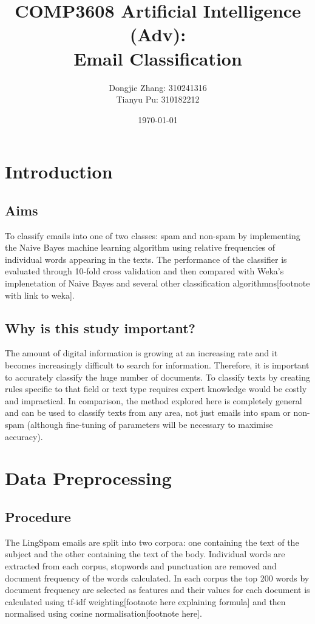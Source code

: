 \documentclass[12pt]{article}
\title{COMP3608 Artificial Intelligence (Adv): \\
Email Classification}
\author{Dongjie Zhang: 310241316 
\\ Tianyu Pu: 310182212}
\date{\today}
\begin{document}
\maketitle

\section{Introduction}
\subsection{Aims}
To classify emails into one of two classes: spam and non-spam by implementing the Naive Bayes machine learning algorithm using relative frequencies of individual words appearing in the texts. The performance of the classifier is evaluated through 10-fold cross validation and then compared with Weka's implenetation of Naive Bayes and several other classification algorithmns[footnote with link to weka].

\subsection{Why is this study important?}
The amount of digital information is growing at an increasing rate and it becomes increasingly difficult to search for information. Therefore, it is important to accurately classify the huge number of documents. To classify texts by creating rules specific to that field or text type requires expert knowledge would be costly and impractical. In comparison, the method explored here is completely general and can be used to classify texts from any area, not just emails into spam or non-spam (although fine-tuning of parameters will be necessary to maximise accuracy).

\section{Data Preprocessing}
\subsection{Procedure}
The LingSpam emails are split into two corpora: one containing the text of the subject and the other containing the text of the body. Individual words are extracted from each corpus, stopwords and punctuation are removed and document frequency of the words calculated. In each corpus the top 200 words by document frequency are selected as features and their values for each document is calculated using tf-idf weighting[footnote here explaining formula] and then normalised using cosine normalisation[footnote here].
\end{document}
